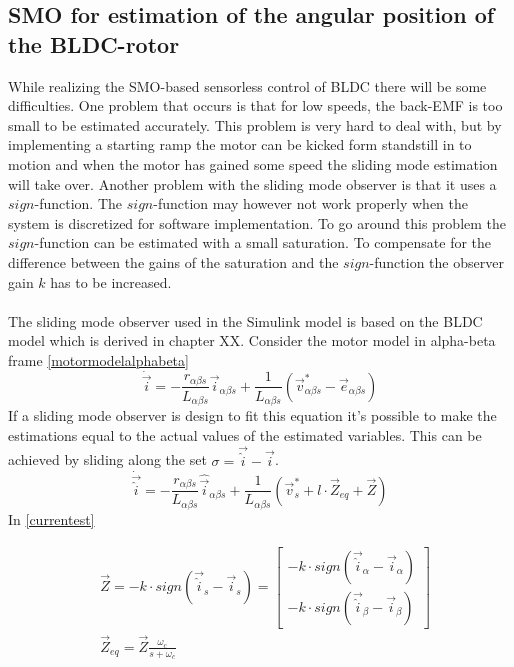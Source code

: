 \documentclass{LTHthesis}
\begin{document}
\subsection{SMO for estimation of the angular position of the BLDC-rotor}
While realizing the SMO-based sensorless control of  BLDC there will be some difficulties. One problem that occurs is that for low speeds, the back-EMF is too small to be estimated accurately. This problem is very hard to deal with, but by implementing a starting ramp the motor can be kicked form standstill in to motion and when the motor has gained some speed the sliding mode estimation will take over. Another problem with the sliding mode observer is that it uses a $sign$-function. The $sign$-function may however not work properly when the system is discretized for software implementation. To go around this problem the $sign$-function can be estimated with a small saturation. To compensate for the difference between the gains of the saturation and the $sign$-function the observer gain $k$ has to be increased. \\ \\ 
The sliding mode observer used in the Simulink model  is based on the BLDC model which is derived in chapter XX. Consider the motor model in alpha-beta frame \eqref{motormodelalphabeta} 
\begin{equation} \label{motormodelalphabeta}
\dot{\vec{i}}=-\frac{r_{\alpha \beta s}}{L_{\alpha \beta s}}\vec{i}_{\alpha \beta s}+ \frac{1}{L_{\alpha \beta s}}(\vec{v}^*_{\alpha \beta s}-\vec{e}_{\alpha \beta s})
\end{equation} 
If a sliding mode observer is design to fit this equation it's possible to make the estimations equal to the actual values of the estimated variables. This can be achieved by sliding along the set $\sigma=\vec{\hat{i}}-\vec{i}$. 
\begin{equation} \label{currentest}
\dot{\vec{\hat{i}}}=-\frac{r_{\alpha \beta s}}{L_{\alpha \beta s}}\hat{\vec{i}}_{\alpha \beta s}+\frac{1}{L_{\alpha \beta s}}(\vec{v}^*_s+l\cdot\vec{Z}_{eq}+\vec{Z})
\end{equation}
In \eqref{currentest} 


\begin{align}
&\vec{Z}=-k\cdot sign(\vec{\hat{i}}_s-\vec{i}_s)=\begin{bmatrix}
-k\cdot sign(\vec{\hat{i}}_\alpha-\vec{i}_\alpha) \nonumber \\
-k\cdot sign(\vec{\hat{i}}_\beta-\vec{i}_\beta)\label{Zdefine1}
\end{bmatrix} \\ 
&\vec{Z}_{eq}=\vec{Z}\frac{\omega_c}{s+\omega_c}
\end{align}
\end{document}
